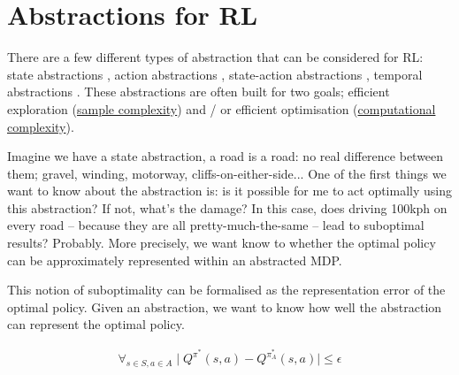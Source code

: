 \section{Abstractions for RL}

There are a few different types of abstraction that can be considered for RL:
state abstractions \cite{Anand2019, Littman2006,Haarnoja,Cuccu2018,Zhonga,Vezzani2019,Abel2018,Duan2018,Abel2017,Silver2016a},
action abstractions \cite{Chandak2019,Bester2019,Tennenholtz2019,Nagabandi2019}, state-action abstractions \cite{Dayan1993,Barreto2017}, temporal abstractions \cite{Christodoulou2019, Rafati,Mankowitz2018,Harutyunyan2017,Fruit2017,Riemer2018,Bacon2018,Achiam2018,Pham2019,Konidaris2018,Haarnoja,Sutton1999,Fruit2017a,Bacon2016a,Jinnai2018,Nachum2018}.
These abstractions are often built for two goals; efficient exploration
(\href{https://en.wikipedia.org/wiki/Sample_complexity}{sample complexity})
and / or efficient optimisation (\href{https://en.wikipedia.org/wiki/Computational_complexity_theory}{computational complexity}).

Imagine we have a state abstraction, a road is a road: no real difference
between them; gravel, winding, motorway, cliffs-on-either-side...
One of the first things we want to know about the abstraction is:
is it possible for me to act optimally
using this abstraction? If not, what's the damage? In this case, does driving 100kph on every road --
because they are all pretty-much-the-same -- lead to suboptimal results? Probably.
More precisely, we want know to whether the optimal policy can be approximately represented within an abstracted MDP.

This notion of suboptimality can be formalised as the representation error of the optimal
policy. Given an abstraction, we want to know how well
the abstraction can represent the optimal policy. \cite{Littman2006, Abel2017} \footnotemark[6]


\begin{align}
\forall_{s\in S, a\in A} \mid Q^{\pi^* }(s, a) - Q^{\pi_{A}^* }(s, a) \mid \le \epsilon
\end{align}

